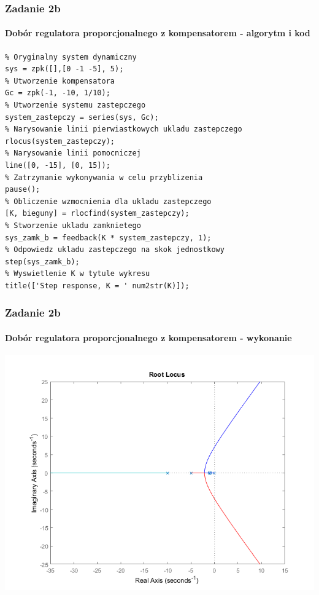 \documentclass{beamer}
\begin{document}
\begin{frame}[fragile]\frametitle{Zadanie 2b}\framesubtitle{Dobór regulatora proporcjonalnego z kompensatorem - algorytm i kod}
	\begin{lstlisting}
% Oryginalny system dynamiczny
sys = zpk([],[0 -1 -5], 5);
% Utworzenie kompensatora
Gc = zpk(-1, -10, 1/10);
% Utworzenie systemu zastepczego
system_zastepczy = series(sys, Gc);
% Narysowanie linii pierwiastkowych ukladu zastepczego
rlocus(system_zastepczy);
% Narysowanie linii pomocniczej
line([0, -15], [0, 15]);
% Zatrzymanie wykonywania w celu przyblizenia
pause();
% Obliczenie wzmocnienia dla ukladu zastepczego
[K, bieguny] = rlocfind(system_zastepczy);
% Stworzenie ukladu zamknietego
sys_zamk_b = feedback(K * system_zastepczy, 1);
% Odpowiedz ukladu zastepczego na skok jednostkowy
step(sys_zamk_b);
% Wyswietlenie K w tytule wykresu
title(['Step response, K = ' num2str(K)]);
	\end{lstlisting}
\end{frame}

\begin{frame}\frametitle{Zadanie 2b}\framesubtitle{Dobór regulatora proporcjonalnego z kompensatorem - wykonanie}
\centering	\includegraphics[scale=0.5]{b-rlocus-bez-linii.png}
\end{frame}
\end{document}
